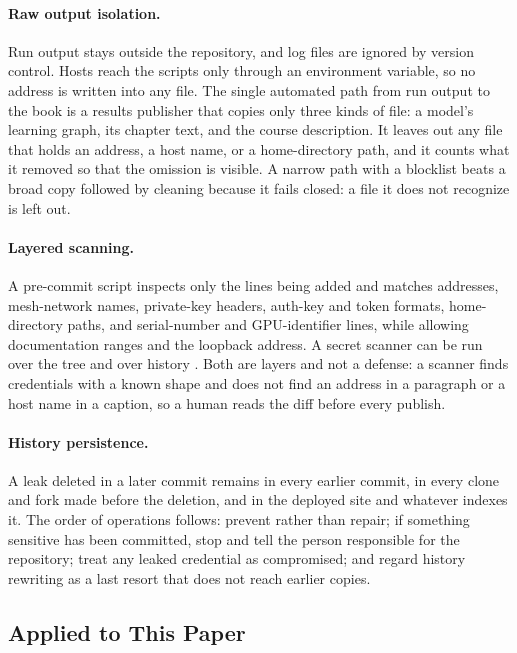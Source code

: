 \documentclass[11pt]{article}
\begin{document}
\paragraph{Raw output isolation.}
Run output stays outside the repository, and log files are ignored by version control. Hosts reach the scripts only through an environment variable, so no address is written into any file. The single automated path from run output to the book is a results publisher that copies only three kinds of file: a model's learning graph, its chapter text, and the course description. It leaves out any file that holds an address, a host name, or a home-directory path, and it counts what it removed so that the omission is visible. A narrow path with a blocklist beats a broad copy followed by cleaning because it fails closed: a file it does not recognize is left out.

\paragraph{Layered scanning.}
A pre-commit script inspects only the lines being added and matches addresses, mesh-network names, private-key headers, auth-key and token formats, home-directory paths, and serial-number and GPU-identifier lines, while allowing documentation ranges and the loopback address. A secret scanner can be run over the tree and over history \cite{gitleaks}. Both are layers and not a defense: a scanner finds credentials with a known shape and does not find an address in a paragraph or a host name in a caption, so a human reads the diff before every publish.

\paragraph{History persistence.}
A leak deleted in a later commit remains in every earlier commit, in every clone and fork made before the deletion, and in the deployed site and whatever indexes it. The order of operations follows: prevent rather than repair; if something sensitive has been committed, stop and tell the person responsible for the repository; treat any leaked credential as compromised; and regard history rewriting as a last resort that does not reach earlier copies.

\subsection{Applied to This Paper}
\end{document}
